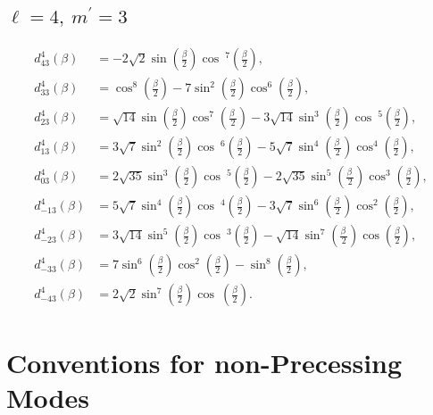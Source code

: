 \documentclass[%
aps,
prd,
amssymb,
amsmath,
amsfonts,
eqsecnum,
showpacs,
nofootinbib,
floatfix,
twocolumn,
twoside,
a4paper,
superscriptaddress
]{revtex4-1}
\begin{document}
\subsection{\texorpdfstring{$\ell = 4,  \:m^{\prime} = 3$}{l=4,m'=3}}
\begin{align*}
    d^4_{43} (\beta) &= -2 \sqrt{2} \sin \left(\frac{\beta }{2}\right) \cos \
^7\left(\frac{\beta }{2}\right), \\
    d^4_{33} (\beta) &= \cos ^8\left(\frac{\beta }{2}\right)-7 \sin ^2\left(\frac{\beta }{2}\right) \cos ^6\left(\frac{\beta }{2}\right), \\
    d^4_{23} (\beta) &= \sqrt{14} \sin \left(\frac{\beta }{2}\right) \cos ^7\left(\frac{\beta \
}{2}\right)-3 \sqrt{14} \sin ^3\left(\frac{\beta }{2}\right) \cos \
^5\left(\frac{\beta }{2}\right), \\
    d^4_{13} (\beta) &= 3 \sqrt{7} \sin ^2\left(\frac{\beta }{2}\right) \cos \
^6\left(\frac{\beta }{2}\right)-5 \sqrt{7} \sin ^4\left(\frac{\beta \
}{2}\right) \cos ^4\left(\frac{\beta }{2}\right), \\
    d^4_{03} (\beta) &= 2 \sqrt{35} \sin ^3\left(\frac{\beta }{2}\right) \cos \
^5\left(\frac{\beta }{2}\right)-2 \sqrt{35} \sin ^5\left(\frac{\beta \
}{2}\right) \cos ^3\left(\frac{\beta }{2}\right), \\
    d^4_{-13} (\beta) &= 5 \sqrt{7} \sin ^4\left(\frac{\beta }{2}\right) \cos \
^4\left(\frac{\beta }{2}\right)-3 \sqrt{7} \sin ^6\left(\frac{\beta \
}{2}\right) \cos ^2\left(\frac{\beta }{2}\right), \\
    d^4_{-23} (\beta) &= 3 \sqrt{14} \sin ^5\left(\frac{\beta }{2}\right) \cos \
^3\left(\frac{\beta }{2}\right)-\sqrt{14} \sin ^7\left(\frac{\beta \
}{2}\right) \cos \left(\frac{\beta }{2}\right), \\
    d^4_{-33} (\beta) &= 7 \sin ^6\left(\frac{\beta }{2}\right) \cos ^2\left(\frac{\beta }{2}\right)-\sin ^8\left(\frac{\beta }{2}\right), \\
    d^4_{-43} (\beta) &= 2 \sqrt{2} \sin ^7\left(\frac{\beta }{2}\right) \cos \
\left(\frac{\beta }{2}\right).
\end{align*}



\section{Conventions for non-Precessing Modes}
\label{sec:conventions_no_prec}
\end{document}
